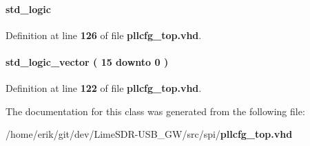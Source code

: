 \paragraph[{pllrst\+\_\+start\+\_\+bit}]{ {\bfseries \textcolor{comment}{std\+\_\+logic}\textcolor{vhdlchar}{ }} \hspace{0.3cm}{\ttfamily [Signal]}}\label{classpllcfg__top_1_1arch_a8442502938b105ef18a916b98292011b}


Definition at line {\bf 126} of file {\bf pllcfg\+\_\+top.\+vhd}.

\paragraph[{pllrst\+\_\+start\+\_\+vect}]{ {\bfseries \textcolor{comment}{std\+\_\+logic\+\_\+vector}\textcolor{vhdlchar}{ }\textcolor{vhdlchar}{(}\textcolor{vhdlchar}{ }\textcolor{vhdlchar}{ } \textcolor{vhdldigit}{15} \textcolor{vhdlchar}{ }\textcolor{keywordflow}{downto}\textcolor{vhdlchar}{ }\textcolor{vhdlchar}{ } \textcolor{vhdldigit}{0} \textcolor{vhdlchar}{ }\textcolor{vhdlchar}{)}\textcolor{vhdlchar}{ }} \hspace{0.3cm}{\ttfamily [Signal]}}\label{classpllcfg__top_1_1arch_ac5e4616891d7385851e2f37e23dc2d29}


Definition at line {\bf 122} of file {\bf pllcfg\+\_\+top.\+vhd}.



The documentation for this class was generated from the following file\+:\begin{DoxyCompactItemize}
\item 
/home/erik/git/dev/\+Lime\+S\+D\+R-\/\+U\+S\+B\+\_\+\+G\+W/src/spi/{\bf pllcfg\+\_\+top.\+vhd}\end{DoxyCompactItemize}
